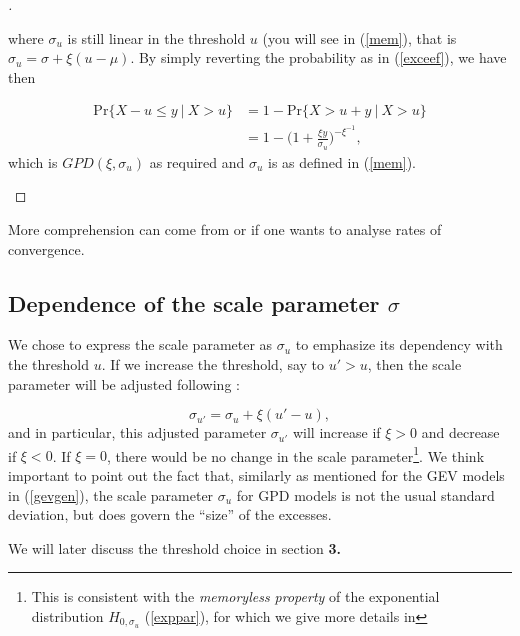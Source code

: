 \documentclass[11pt,a4paper,openany ]{book}
\begin{document}
\begin{proof}[\nopunct ]
\begin{itemize}
		where $\sigma_u$ is still linear in the threshold $u$ (you will see in (\ref{mem}), that is $\sigma_u=\sigma+\xi(u-\mu)$. By simply reverting the probability  as in (\ref{exceef}), we have then 
		
		\begin{equation}
		\begin{aligned}
		\text{Pr}\{X-u\leq y\ | \ X>u\} & =1-\text{Pr}\{X>u+y\ | \ X>u\} \\
		& = 1-\bigg(1+\frac{\xi y}{\sigma_u}\bigg)^{-\xi^{-1}},
		\end{aligned}
		\end{equation}
		which is $GPD(\xi,\sigma_u)$ as required and $\sigma_u$ is as defined in 
		(\ref{mem}).
	\end{itemize}
\end{proof}
More comprehension can come from \cite[pp.27-28]{reiss_statistical_2007} or if one wants to 
analyse rates of convergence.


\subsection{Dependence of the scale parameter $\sigma$} We chose to express the scale parameter as $\sigma_u$ to emphasize its dependency with the threshold $u$. If we increase the threshold, say to $u'>u$, then the scale parameter will be adjusted following :

\begin{equation} \label{mem}
\sigma_{u'}=\sigma_u+\xi (u'-u),
\end{equation}
and in particular, this adjusted parameter $\sigma_{u'}$ will increase if $\xi>0$ and decrease if $\xi<0$.
If $\xi =0$, there would be no change in the scale parameter\footnote{This is consistent with the \emph{memoryless property} of the exponential distribution $H_{0,\sigma_u}$ (\ref{exppar}), for which we give more details in}. 
We think important to point out the fact that, similarly as mentioned for the GEV models in (\ref{gevgen}), the scale parameter $\sigma_u$ for GPD models
is not the usual standard deviation, but does govern the “size” of the excesses. \cite[pp.20]{AghaKouchak_extremes_2013}

We will later discuss the threshold choice in section \textbf{3.}
\end{document}
